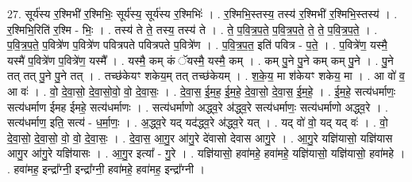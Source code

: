 \documentclass[17pt]{extarticle}
\begin{document}
27. सूर्य॑स्य र॒श्मिभी॑ र॒श्मिभिः॒ सूर्य॑स्य॒ सूर्य॑स्य र॒श्मिभिः॑ । . र॒श्मिभि॒स्तस्य॒ तस्य॑ र॒श्मिभी॑ र॒श्मिभि॒स्तस्य॑ । . र॒श्मिभि॒रिति॑ र॒श्मि - भिः॒ । . तस्य॑ ते ते॒ तस्य॒ तस्य॑ ते । . ते॒ प॒वि॒त्र॒प॒ते॒ प॒वि॒त्र॒प॒ते॒ ते॒ ते॒ प॒वि॒त्र॒प॒ते॒ । . प॒वि॒त्र॒प॒ते॒ प॒वित्रे॑ण प॒वित्रे॑ण पवित्रपते पवित्रपते प॒वित्रे॑ण । . प॒वि॒त्र॒प॒त॒ इति॑ पवित्र - प॒ते॒ । . प॒वित्रे॑ण॒ यस्मै॒ यस्मै॑ प॒वित्रे॑ण प॒वित्रे॑ण॒ यस्मै᳚ । . यस्मै॒ कम् कं ॅयस्मै॒ यस्मै॒ कम् । . कम् पु॒ने पु॒ने कम् कम् पु॒ने । . पु॒ने तत् तत् पु॒ने पु॒ने तत् । . तच्छ॑केयꣳ शकेय॒म् तत् तच्छ॑केयम् । . श॒के॒य॒ मा श॑केयꣳ शकेय॒ मा । . आ वो॑ व॒ आ वः॑ । . वो॒ दे॒वा॒सो॒ दे॒वा॒सो॒वो॒ वो॒ दे॒वा॒सः॒ । . दे॒वा॒स॒ ई॒म॒ह॒ ई॒म॒हे॒ दे॒वा॒सो॒ दे॒वा॒स॒ ई॒म॒हे॒ । . ई॒म॒हे॒ सत्य॑धर्माणः॒ सत्य॑धर्माण ईमह ईमहे॒ सत्य॑धर्माणः । . सत्य॑धर्माणो अद्ध्व॒रे अ॑द्ध्व॒रे सत्य॑धर्माणः॒ सत्य॑धर्माणो अद्ध्व॒रे । . सत्य॑धर्माण॒ इति॒ सत्य॑ - ध॒र्मा॒णः॒ । . अ॒द्ध्व॒रे यद् यद॑द्ध्व॒रे अ॑द्ध्व॒रे यत् । . यद् वो॑ वो॒ यद् यद् वः॑ । . वो॒ दे॒वा॒सो॒ दे॒वा॒सो॒ वो॒ वो॒ दे॒वा॒सः॒ । . दे॒वा॒स॒ आ॒गु॒र आ॑गु॒रे दे॑वासो देवास आगु॒रे । . आ॒गु॒रे यज्ञि॑यासो॒ यज्ञि॑यास आगु॒र आ॑गु॒रे यज्ञि॑यासः । . आ॒गु॒र इत्या᳚ - गु॒रे । . यज्ञि॑यासो॒ हवा॑महे॒ हवा॑महे॒ यज्ञि॑यासो॒ यज्ञि॑यासो॒ हवा॑महे । . हवा॑मह॒ इन्द्रा᳚ग्नी॒ इन्द्रा᳚ग्नी॒ हवा॑महे॒ हवा॑मह॒ इन्द्रा᳚ग्नी । \newline
\end{document}
